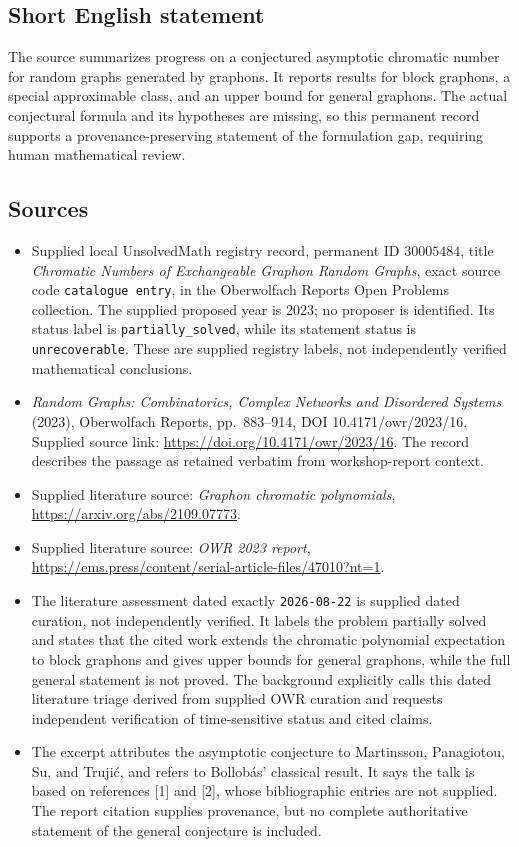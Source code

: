 \documentclass[11pt]{article}
\begin{document}
\subsection{Short English statement}
The source summarizes progress on a conjectured asymptotic chromatic number for random graphs generated by graphons. It reports results for block graphons, a special approximable class, and an upper bound for general graphons. The actual conjectural formula and its hypotheses are missing, so this permanent record supports a provenance-preserving statement of the formulation gap, requiring human mathematical review.
\subsection{Sources}
\begin{itemize}
\item Supplied local UnsolvedMath registry record, permanent ID \(30005484\), title \emph{Chromatic Numbers of Exchangeable Graphon Random Graphs}, exact source code \texttt{catalogue entry}, in the Oberwolfach Reports Open Problems collection. The supplied proposed year is 2023; no proposer is identified. Its status label is \texttt{partially\_solved}, while its statement status is \texttt{unrecoverable}. These are supplied registry labels, not independently verified mathematical conclusions.
\item \emph{Random Graphs: Combinatorics, Complex Networks and Disordered Systems} (2023), Oberwolfach Reports, pp.\ 883--914, DOI 10.4171/owr/2023/16. Supplied source link: \url{https://doi.org/10.4171/owr/2023/16}. The record describes the passage as retained verbatim from workshop-report context.
\item Supplied literature source: \emph{Graphon chromatic polynomials}, \url{https://arxiv.org/abs/2109.07773}.
\item Supplied literature source: \emph{OWR 2023 report}, \url{https://ems.press/content/serial-article-files/47010?nt=1}.
\item The literature assessment dated exactly \texttt{2026-08-22} is supplied dated curation, not independently verified. It labels the problem partially solved and states that the cited work extends the chromatic polynomial expectation to block graphons and gives upper bounds for general graphons, while the full general statement is not proved. The background explicitly calls this dated literature triage derived from supplied OWR curation and requests independent verification of time-sensitive status and cited claims.
\item The excerpt attributes the asymptotic conjecture to Martinsson, Panagiotou, Su, and Truji\'{c}, and refers to Bollob\'{a}s' classical result. It says the talk is based on references [1] and [2], whose bibliographic entries are not supplied. The report citation supplies provenance, but no complete authoritative statement of the general conjecture is included.
\end{itemize}
\end{document}
